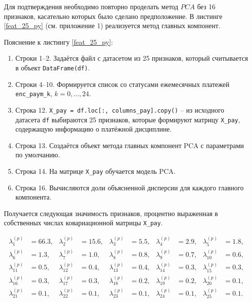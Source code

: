  Для подтверждения необходимо повторно проделать метод $PCA$ без 16 признаков, касательно которых было сделано предположение. В листинге \ref{feat_25_py} (см. приложение 1) реализуется метод главных компонент. 

{\co Пояснение к листингу \ref{feat_25_py}:} 
\begin{enumerate}[nosep]
   \item Строки 1--2. Задаётся файл с датасетом из 25 признаков, который считывается в объект \texttt{DataFrame(df)}. 
   \item Строки 4--10. Формируется список со статусами ежемесячных платежей \texttt{enc\_paym\_k}, $k = 0,\dots,24$.
   \item Строка 12. \texttt{X\_pay = df.loc[:, columns\_pay].copy()} -- из исходного датасета \texttt{df} выбираются 25 признаков, которые формируют матрицу \texttt{X\_pay}, содержащую информацию о платёжной дисциплине.
   \item Строка 13. Создаётся объект метода главных компонент PCA с параметрами по умолчанию.
   \item Строка 14. На матрице \texttt{X\_pay} обучается модель PCA.
   \item Строка 16. Вычисляются доли объясненной дисперсии для каждого главного компонента.
\end{enumerate}

Получается следующая значимость признаков, процентно выраженная в собственных числах ковариационной матрицы  \texttt{X\_pay}.

\begin{equation}
\label{pca_lambda41_modified}
\begin{alignedat}{5} %
\lambda_{1}^{(p)}  &= 66.3, & \lambda_{2}^{(p)}  &= 15.6, & \lambda_{3}^{(p)}  &= 5.5, & \lambda_{4}^{(p)}  &= 2.9, & \lambda_{5}^{(p)}  &= 1.8,\\
\lambda_{6}^{(p)}  &= 1.3,  & \lambda_{7}^{(p)}  &= 1.0,  & \lambda_{8}^{(p)}  &= 0.8, & \lambda_{9}^{(p)}  &= 0.7,  & \lambda_{10}^{(p)} &= 0.6,\\
\lambda_{11}^{(p)} &= 0.5, & \lambda_{12}^{(p)} &= 0.4, & \lambda_{13}^{(p)} &= 0.4, & \lambda_{14}^{(p)} &= 0.3,  & \lambda_{15}^{(p)} &= 0.3,\\
\lambda_{16}^{(p)} &= 0.3, & \lambda_{17}^{(p)} &= 0.3, & \lambda_{18}^{(p)} &= 0.2, & \lambda_{19}^{(p)} &= 0.2,  & \lambda_{20}^{(p)} &= 0.1,\\
\lambda_{21}^{(p)} &= 0.1, & \lambda_{22}^{(p)} &= 0.1, & \lambda_{23}^{(p)} &= 0.1, & \lambda_{24}^{(p)} &= 0.1,  & \lambda_{25}^{(p)} &= 0.1.
\end{alignedat}
\end{equation}

